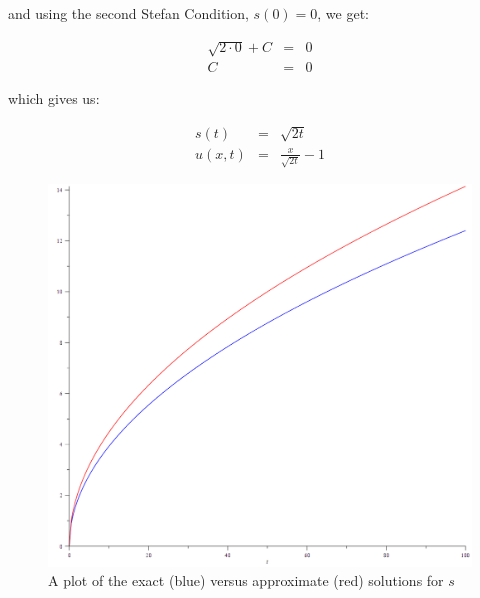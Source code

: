 \documentclass{report}
\begin{document}
and using the second Stefan Condition, $s(0) = 0$, we get:\bigskip

\begin{eqnarray*} 
\sqrt{2 \cdot 0} + C & = & 0 \\
                   C & = & 0 
\end{eqnarray*}\medskip

which gives us:\bigskip

\begin{eqnarray*} 
   s(t) & = & \sqrt{2 t} \\
u(x, t) & = & \frac{x}{\sqrt{2 t}} - 1 
\end{eqnarray*}\medskip

\begin{figure}[t]
\centering
\includegraphics[scale = 0.15]{s-exact-vs-approximate}
\caption{A plot of the exact (blue) versus approximate (red) solutions for $s$}
\label{fig:s-exact-vs-approximate}
\end{figure}
\end{document}
